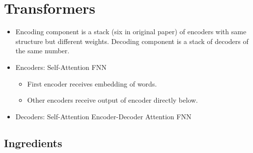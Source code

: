 \chapter{Transformers}

\begin{itemize}
\item 
Encoding component is a stack (six in original paper) of encoders with same structure but different weights. Decoding component is a stack of decoders of the same number.

\item 
Encoders: Self-Attention \textrightarrow{} FNN
	\begin{itemize}
	\item 
	First encoder receives embedding of words.
	
	\item 
	Other encoders receive output of encoder directly below.
	\end{itemize}

\item 
Decoders: Self-Attention \textrightarrow{} Encoder-Decoder Attention \textrightarrow{} FNN
\end{itemize}

\section{Ingredients}
